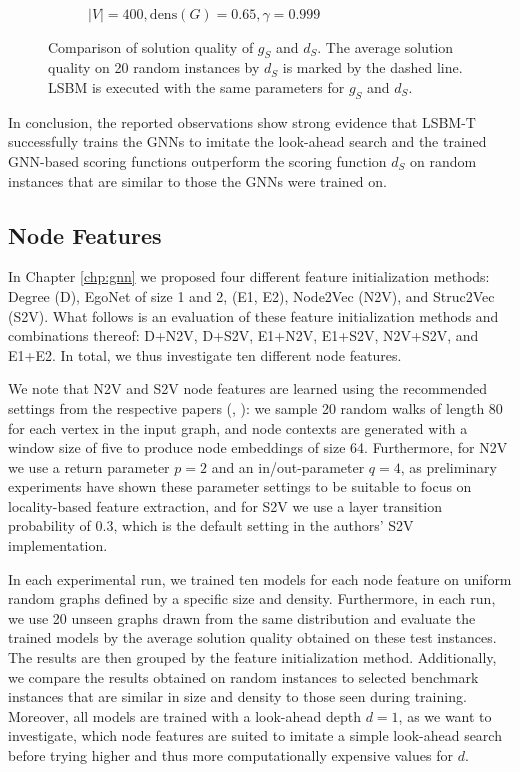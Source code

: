\documentclass[draft,final]{vutinfth} %
\begin{document}
\begin{figure}
\begin{subfigure}{0.49\textwidth}
        \caption{$|V|=400, \mathrm{dens}(G)=0.65, \gamma=0.999$}
    \end{subfigure}
    \caption{Comparison of solution quality of $g_S$ and $d_S$. The average solution quality on 20 random instances by $d_S$ is marked by the dashed line. LSBM is executed with the same parameters for $g_S$ and $d_S$.}
    \label{fig:comparison-ds}
\end{figure}

In conclusion, the reported observations show strong evidence that LSBM-T successfully trains the GNNs to imitate the look-ahead search and the trained GNN-based scoring functions outperform the scoring function $d_S$ on random instances that are similar to those the GNNs were trained on. 


\subsection{Node Features}\label{subsec:node-features}
In Chapter \ref{chp:gnn} we proposed four different feature initialization methods: Degree (D), EgoNet of size 1 and 2, (E1, E2), Node2Vec (N2V), and Struc2Vec (S2V). What follows is an evaluation of these feature initialization methods and combinations thereof: D+N2V, D+S2V, E1+N2V, E1+S2V, N2V+S2V, and E1+E2. In total, we thus investigate ten different node features. 

We note that N2V and S2V node features are learned using the recommended settings from the respective papers (\cite{GroverL16}, \cite{FigueiredoRS17}): we sample 20 random walks of length 80 for each vertex in the input graph, and node contexts are generated with a window size of five to produce node embeddings of size 64. Furthermore, for N2V we use a return parameter $p=2$ and an in/out-parameter $q=4$, as preliminary experiments have shown these parameter settings to be suitable to focus on locality-based feature extraction, and for S2V we use a layer transition probability of $0.3$, which is the default setting in the authors' S2V implementation. 

In each experimental run, we trained ten models for each node feature on uniform random graphs defined by a specific size and density. 
Furthermore, in each run, we use 20 unseen graphs drawn from the same distribution and evaluate the trained models by the average solution quality obtained on these test instances. The results are then grouped by the feature initialization method. Additionally, we compare the results obtained on random instances to selected benchmark instances that are similar in size and density to those seen during training. 
Moreover, all models are trained with a look-ahead depth $d=1$, as we want to investigate, which node features are suited to imitate a simple look-ahead search before trying higher and thus more computationally expensive values for $d$. 
\end{document}
